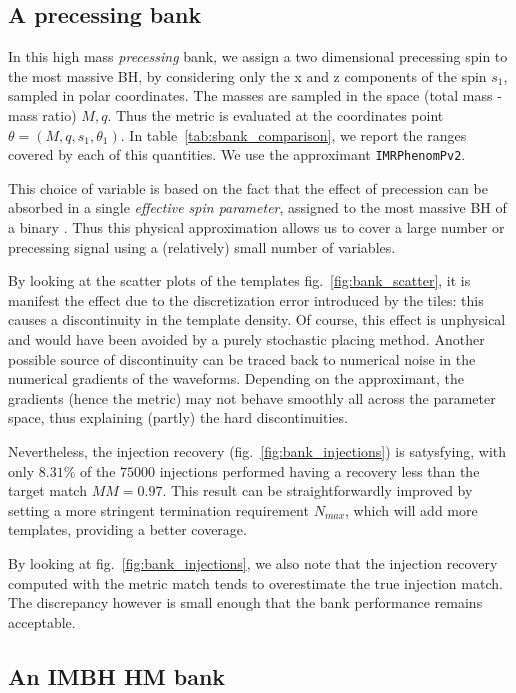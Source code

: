 \documentclass[twocolumn,showpacs,preprintnumbers,nofootinbib,prd,
superscriptaddress,10pt]{revtex4-2}
\begin{document}
\subsection{A precessing bank}\label{sec:precessing_bank}
	
In this high mass {\it precessing} bank, we assign a two dimensional precessing spin to the most massive BH, by considering only the x and z components of the spin $s_1$, sampled in polar coordinates. The masses are sampled in the space (total mass - mass ratio) $M,q$.  Thus the metric is evaluated at the coordinates point $\theta = (M, q, s_1, \theta_1)$. In table~\ref{tab:sbank_comparison}, we report the ranges covered by each of this quantities. We use the approximant \texttt{IMRPhenomPv2}.

This choice of variable is based on the fact that the effect of precession can be absorbed in a single {\it effective spin parameter}, assigned to the most massive BH of a binary \cite{PhysRevD.91.024043, PhysRevD.103.083022}. Thus this physical approximation allows us to cover a large number or precessing signal using a (relatively) small number of variables.

By looking at the scatter plots of the templates fig.~\ref{fig:bank_scatter}, it is manifest the effect due to the discretization error introduced by the tiles: this causes a discontinuity in the template density. Of course, this effect is unphysical and would have been avoided by a purely stochastic placing method.
Another possible source of discontinuity can be traced back to numerical noise in the numerical gradients of the waveforms. Depending on the approximant, the gradients (hence the metric) may not behave smoothly all across the parameter space, thus explaining (partly) the hard discontinuities.

Nevertheless, the injection recovery (fig.~\ref{fig:bank_injections}) is satysfying, with only $8.31\%$ of the $75000$ injections performed having a recovery less than the target match $MM = 0.97$.
This result can be straightforwardly improved by setting a more stringent termination requirement $N_{max}$, which will add more templates, providing a better coverage.

By looking at fig.~\ref{fig:bank_injections}, we also note that the injection recovery computed with the metric match tends to overestimate the true injection match. The discrepancy however is small enough that the bank performance remains acceptable.

\subsection{An IMBH HM bank}\label{sec:HM_bank}
\end{document}
